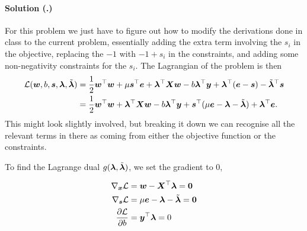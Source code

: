 \documentclass{article}
\newcounter{problemSheetNumber}
\newcounter{problems}
\renewcommand{\solution}[1]{\paragraph{Solution (\theproblemSheetNumber.\theproblems)}\addtocounter{problems}{1}\label{#1}}
\begin{document}
\solution{pr:2} For this problem we just have to figure out how to modify the derivations done in class to the current problem, essentially adding the extra term involving the $s_i$ in the objective, replacing the $-1$ with $-1+s_i$ in the constraints, and adding some non-negativity constraints for the $s_i$. The Lagrangian of the problem is then
\begin{align*}
  \mathcal{L}(\bm{w},b,\bm{s},\bm{\lambda},\tilde{\bm{\lambda}}) &= \frac{1}{2}\bm{w}^{\top}\bm{w}+\mu \bm{s}^{\top}\bm{e} + \bm{\lambda}^{\top}\bm{X}\bm{w}-b\bm{\lambda}^{\top}\bm{y}+\bm{\lambda}^{\top}(\bm{e}-\bm{s})-\tilde{\bm{\lambda}}^{\top}\bm{s}\\
  &=\frac{1}{2}\bm{w}^{\top}\bm{w}+ \bm{\lambda}^{\top}\bm{X}\bm{w}-b\bm{\lambda}^{\top}\bm{y}+\bm{s}^{\top}(\mu\bm{e}-\bm{\lambda}-\tilde{\bm{\lambda}})+\bm{\lambda}^{\top}\bm{e}.
\end{align*}
This might look slightly involved, but breaking it down we can recognise all the relevant terms in there as coming from either the objective function or the constraints.

To find the Lagrange dual $g(\bm{\lambda},\tilde{\bm{\lambda}})$, we set the gradient to $0$,

\begin{align*}
\nabla_{\bm{x}}\mathcal{L} &= \bm{w}-\bm{X}^{\top}\bm{\lambda} = \bm{0}\\
\nabla_{\bm{s}}\mathcal{L} &= \mu\bm{e}-\bm{\lambda}-\tilde{\bm{\lambda}} = \bm{0}\\
\frac{\partial \mathcal{L}}{\partial b} &= \bm{y}^{\top}\bm{\lambda} = 0 
\end{align*}
\end{document}
